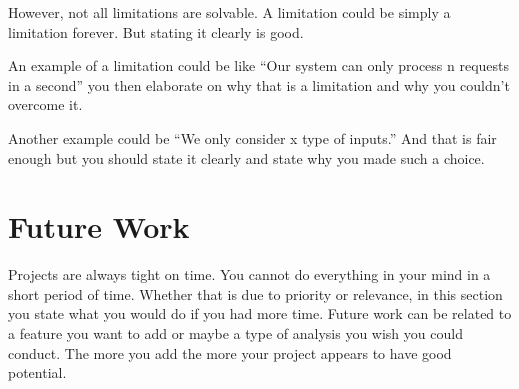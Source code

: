 However, not all limitations are solvable. A limitation could be simply a limitation forever. But stating it clearly is good. 

An example of a limitation could be like ``Our system can only process n requests in a second'' you then elaborate on why that is a limitation and why you couldn't overcome it. 

Another example could be ``We only consider x type of inputs.'' And that is fair enough but you should state it clearly and state why you made such a choice.


\section{Future Work} %
\label{sec:future_work}

Projects are always tight on time. You cannot do everything in your mind in a short period of time. Whether that is due to priority or relevance, in this section you state what you would do if you had more time. Future work can be related to a feature you want to add or maybe a type of analysis you wish you could conduct. The more you add the more your project appears to have good potential.

